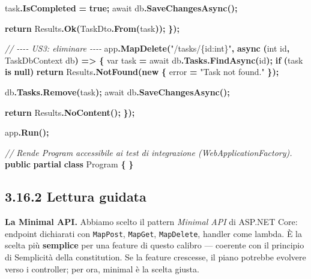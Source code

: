 \documentclass[
  italian,
  10pt,
]{book}
\newenvironment{Shaded}{\begin{snugshade}}{\end{snugshade}}
\newcommand{\CommentTok}[1]{\textcolor[rgb]{0.56,0.35,0.01}{\textit{#1}}}
\newcommand{\DataTypeTok}[1]{\textcolor[rgb]{0.13,0.29,0.53}{#1}}
\newcommand{\FunctionTok}[1]{\textcolor[rgb]{0.13,0.29,0.53}{\textbf{#1}}}
\newcommand{\KeywordTok}[1]{\textcolor[rgb]{0.13,0.29,0.53}{\textbf{#1}}}
\newcommand{\NormalTok}[1]{#1}
\newcommand{\OperatorTok}[1]{\textcolor[rgb]{0.81,0.36,0.00}{\textbf{#1}}}
\newcommand{\StringTok}[1]{\textcolor[rgb]{0.31,0.60,0.02}{#1}}
\begin{document}
\begin{Shaded}
\begin{Highlighting}[]
\NormalTok{    task}\OperatorTok{.}\FunctionTok{IsCompleted} \OperatorTok{=} \KeywordTok{true}\OperatorTok{;}
\NormalTok{    await db}\OperatorTok{.}\FunctionTok{SaveChangesAsync}\OperatorTok{();}

    \KeywordTok{return}\NormalTok{ Results}\OperatorTok{.}\FunctionTok{Ok}\OperatorTok{(}\NormalTok{TaskDto}\OperatorTok{.}\FunctionTok{From}\OperatorTok{(}\NormalTok{task}\OperatorTok{));}
\OperatorTok{\});}

\CommentTok{// {-}{-}{-}{-} US3: eliminare {-}{-}{-}{-}}
\NormalTok{app}\OperatorTok{.}\FunctionTok{MapDelete}\OperatorTok{(}\StringTok{"/tasks/\{id:int\}"}\OperatorTok{,} \FunctionTok{async} \OperatorTok{(}\DataTypeTok{int}\NormalTok{ id}\OperatorTok{,}\NormalTok{ TaskDbContext db}\OperatorTok{)} \OperatorTok{=\textgreater{}}
\OperatorTok{\{}
    \DataTypeTok{var}\NormalTok{ task }\OperatorTok{=}\NormalTok{ await db}\OperatorTok{.}\FunctionTok{Tasks}\OperatorTok{.}\FunctionTok{FindAsync}\OperatorTok{(}\NormalTok{id}\OperatorTok{);}
    \KeywordTok{if} \OperatorTok{(}\NormalTok{task }\KeywordTok{is} \KeywordTok{null}\OperatorTok{)}
        \KeywordTok{return}\NormalTok{ Results}\OperatorTok{.}\FunctionTok{NotFound}\OperatorTok{(}\KeywordTok{new} \OperatorTok{\{}\NormalTok{ error }\OperatorTok{=} \StringTok{"Task not found."} \OperatorTok{\});}

\NormalTok{    db}\OperatorTok{.}\FunctionTok{Tasks}\OperatorTok{.}\FunctionTok{Remove}\OperatorTok{(}\NormalTok{task}\OperatorTok{);}
\NormalTok{    await db}\OperatorTok{.}\FunctionTok{SaveChangesAsync}\OperatorTok{();}

    \KeywordTok{return}\NormalTok{ Results}\OperatorTok{.}\FunctionTok{NoContent}\OperatorTok{();}
\OperatorTok{\});}

\NormalTok{app}\OperatorTok{.}\FunctionTok{Run}\OperatorTok{();}

\CommentTok{// Rende Program accessibile ai test di integrazione (WebApplicationFactory).}
\KeywordTok{public} \KeywordTok{partial} \KeywordTok{class}\NormalTok{ Program }\OperatorTok{\{} \OperatorTok{\}}
\end{Highlighting}
\end{Shaded}

\subsection{3.16.2 Lettura guidata}\label{lettura-guidata-2}

\textbf{La Minimal API.} Abbiamo scelto il pattern \emph{Minimal API} di
ASP.NET Core: endpoint dichiarati con \texttt{MapPost}, \texttt{MapGet},
\texttt{MapDelete}, handler come lambda. È la scelta più
\textbf{semplice} per una feature di questo calibro --- coerente con il
principio di Semplicità della constitution. Se la feature crescesse, il
piano potrebbe evolvere verso i controller; per ora, minimal è la scelta
giusta.
\end{document}
